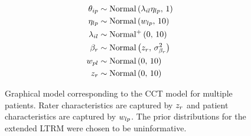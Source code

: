 \documentclass[a4paper]{article}
\begin{document}
\begin{figure}[!ht]
\begin{minipage}{0.4\textwidth}
{\begin{align*}
	\theta_{ip} &\sim \text{Normal}\left(\lambda_{il}\eta_{lp},\,1\right)\\
	\eta_{lp} &\sim \text{Normal}\left(w_{lp},\,10\right) \\
	\lambda_{il} &\sim \text{Normal\textsuperscript{+}}\left(0,\,10\right) \\
	\beta_r   &\sim \text{Normal}\left(z_r,\,\sigma_{\beta_r}^2\right)\\
	w_{pl} & \sim\text{Normal}\left(0,\,10\right) \\
	z_r &\sim \text{Normal}\left(0,\,10\right)
	\end{align*}
}%
\end{minipage}
	\caption{Graphical model corresponding to the CCT model for multiple patients. Rater characteristics are captured by $z_r$ and patient characteristics are captured by $w_{lp}$. The prior distributions for the extended LTRM were chosen to be uninformative.}%
	\label{model:LTRM3}
\end{figure}

\end{document}
